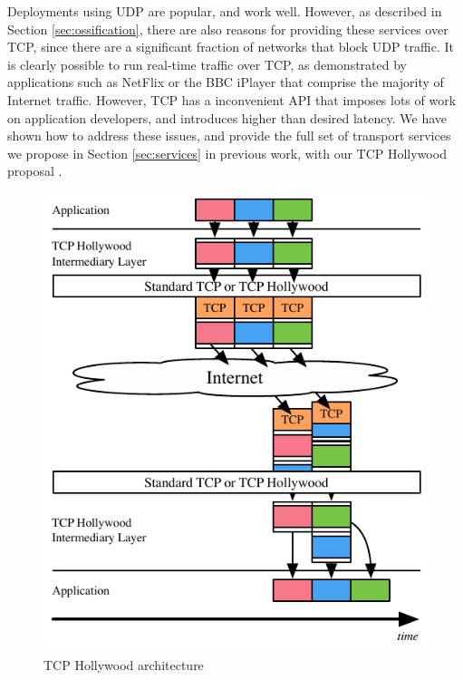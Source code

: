 \documentclass[10pt]{sig-alternate-05-2015}
\begin{document}
Deployments using UDP are popular, and work well. However, as described in
Section \ref{sec:ossification}, there are also reasons for providing these
services over TCP, since there are a significant fraction of networks that
block UDP traffic. It is clearly possible to run real-time traffic over
TCP, as demonstrated by applications such as NetFlix or the BBC iPlayer
that comprise the majority of Internet traffic. However, TCP has a
inconvenient API that imposes lots of work on application developers, and
introduces higher than desired latency. We have shown how to address these
issues, and provide the full set of transport services we propose in
Section \ref{sec:services} in previous work, with our TCP Hollywood
proposal \cite{mcquistin2016hollywood}.

\begin{figure}[t]
 \centering
 \includegraphics[scale=0.965]{figures/tcp-hollywood.pdf}
 \caption{TCP Hollywood architecture}
\label{diagram:tcp-hollywood}
\end{figure}
\end{document}
